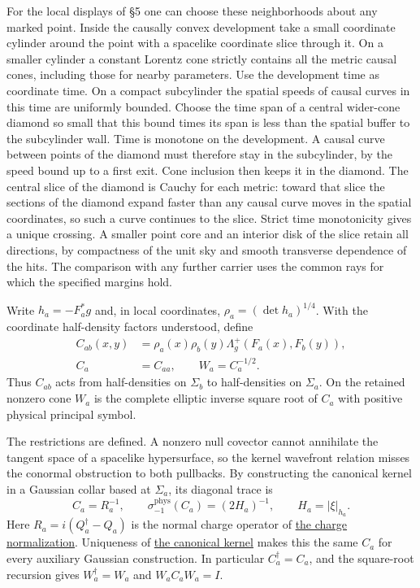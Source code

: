 \documentclass[
  english,
  11pt,
  reqno]{amsart}
\begin{document}
For the local displays of §5 one can choose these neighborhoods about
any marked point. Inside the causally convex development take a small
coordinate cylinder around the point with a spacelike coordinate slice
through it. On a smaller cylinder a constant Lorentz cone strictly
contains all the metric causal cones, including those for nearby
parameters. Use the development time as coordinate time. On a compact
subcylinder the spatial speeds of causal curves in this time are
uniformly bounded. Choose the time span of a central wider-cone diamond
so small that this bound times its span is less than the spatial buffer
to the subcylinder wall. Time is monotone on the development. A causal
curve between points of the diamond must therefore stay in the
subcylinder, by the speed bound up to a first exit. Cone inclusion then
keeps it in the diamond. The central slice of the diamond is Cauchy for
each metric: toward that slice the sections of the diamond expand faster
than any causal curve moves in the spatial coordinates, so such a curve
continues to the slice. Strict time monotonicity gives a unique
crossing. A smaller point core and an interior disk of the slice retain
all directions, by compactness of the unit sky and smooth transverse
dependence of the hits. The comparison with any further carrier uses the
common rays for which the specified margins hold.

Write \(h_a=-F_a^*g\) and, in local coordinates,
\(\rho_a=(\det h_a)^{1/4}\). With the coordinate half-density factors
understood, define%
 \[
\begin{aligned}
C_{ab}(x,y)
&=\rho_a(x)\rho_b(y)
  \Lambda_g^+(F_a(x),F_b(y)),\\
C_a&=C_{aa},\qquad W_a=C_a^{-1/2}.
\end{aligned}
\] Thus \(C_{ab}\) acts from half-densities on \(\Sigma_b\) to
half-densities on \(\Sigma_a\). On the retained nonzero cone \(W_a\) is
the complete elliptic inverse square root of \(C_a\) with positive
physical principal symbol.

The restrictions are defined. A nonzero null covector cannot annihilate
the tangent space of a spacelike hypersurface, so the kernel wavefront
relation misses the conormal obstruction to both pullbacks. By
constructing the canonical kernel in a Gaussian collar based at
\(\Sigma_a\), its diagonal trace is%
 \[
C_a=R_a^{-1},\qquad
\sigma_{-1}^{\mathrm{phys}}(C_a)=(2H_a)^{-1},
\qquad H_a=|\xi|_{h_a}.
\] Here \(R_a=i(Q_a^\dagger-Q_a)\) is the normal charge operator of
\hyperref[prop:online-wave-charge-normalization]{the charge
normalization}. Uniqueness of
\hyperref[thm:online-canonical-wave-kernel]{the canonical kernel} makes
this the same \(C_a\) for every auxiliary Gaussian construction. In
particular \(C_a^\dagger=C_a\), and the square-root recursion gives
\(W_a^\dagger=W_a\) and \(W_aC_aW_a=I\).
\end{document}
